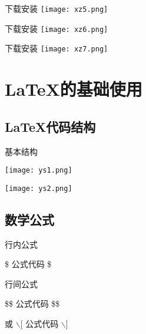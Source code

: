 \documentclass[UTF8]{ctexbeamer}
\begin{document}
\begin{frame}{下载安装}
\texttt{[image: xz5.png]}

\end{frame}



\begin{frame}{下载安装}
\texttt{[image: xz6.png]}

\end{frame}


\begin{frame}{下载安装}
\texttt{[image: xz7.png]}

\end{frame}




\section{\LaTeX 的基础使用}


\subsection{\LaTeX 代码结构}

\begin{frame}{基本结构}

\texttt{[image: ys1.png]}

\texttt{[image: ys2.png]}

\end{frame}











\subsection{数学公式}

\begin{frame}{行内公式}

\$ 公式代码 \$


\end{frame}

\begin{frame}{行间公式}

\$\$ 公式代码 \$\$ 

或 $\backslash$[ 公式代码 $\backslash$]

\end{frame}
\end{document}
